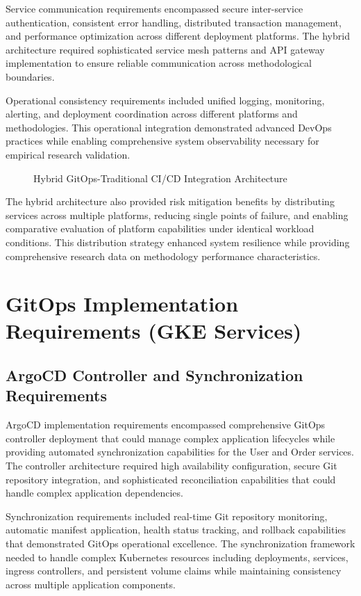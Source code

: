 Service communication requirements encompassed secure inter-service authentication, consistent error handling, distributed transaction management, and performance optimization across different deployment platforms. The hybrid architecture required sophisticated service mesh patterns and API gateway implementation to ensure reliable communication across methodological boundaries.

Operational consistency requirements included unified logging, monitoring, alerting, and deployment coordination across different platforms and methodologies. This operational integration demonstrated advanced DevOps practices while enabling comprehensive system observability necessary for empirical research validation.

\begin{figure}[H]
\centering
\caption{Hybrid GitOps-Traditional CI/CD Integration Architecture}
\label{fig:hybrid-architecture-integration}
\end{figure}

The hybrid architecture also provided risk mitigation benefits by distributing services across multiple platforms, reducing single points of failure, and enabling comparative evaluation of platform capabilities under identical workload conditions. This distribution strategy enhanced system resilience while providing comprehensive research data on methodology performance characteristics.

\section{GitOps Implementation Requirements (GKE Services)}

\subsection{ArgoCD Controller and Synchronization Requirements}

ArgoCD implementation requirements encompassed comprehensive GitOps controller deployment that could manage complex application lifecycles while providing automated synchronization capabilities for the User and Order services. The controller architecture required high availability configuration, secure Git repository integration, and sophisticated reconciliation capabilities that could handle complex application dependencies.

Synchronization requirements included real-time Git repository monitoring, automatic manifest application, health status tracking, and rollback capabilities that demonstrated GitOps operational excellence. The synchronization framework needed to handle complex Kubernetes resources including deployments, services, ingress controllers, and persistent volume claims while maintaining consistency across multiple application components.

